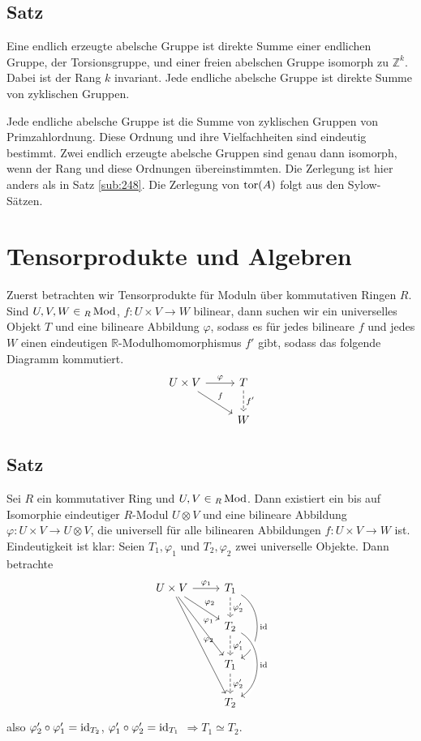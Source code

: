 \subsection[Satz: Umformulierung des Struktursatzes für endl. erzeugte abelsche Gruppen]{Satz} %
\label{sub:253}
Eine endlich erzeugte abelsche Gruppe ist direkte Summe einer endlichen Gruppe, der Torsionsgruppe, und einer freien abelschen Gruppe isomorph zu $\mathds{Z}^k$. Dabei ist 
der Rang $k$ invariant. Jede endliche abelsche Gruppe ist direkte Summe von zyklischen Gruppen.

Jede endliche abelsche Gruppe ist die Summe von zyklischen Gruppen von Primzahlordnung. Diese Ordnung und ihre Vielfachheiten sind eindeutig bestimmt. Zwei endlich erzeugte
abelsche Gruppen sind genau dann isomorph, wenn der Rang und diese Ordnungen übereinstimmten.
Die Zerlegung ist hier anders als in Satz \ref{sub:248}. Die Zerlegung von $\operatorname{tor}(A)$ folgt aus den Sylow-Sätzen.
\newpage

\section{Tensorprodukte und Algebren} %
\label{sec:3}
Zuerst betrachten wir Tensorprodukte für Moduln über kommutativen Ringen $R$. Sind $U,V, W \in {_R \operatorname{Mod}}$, $f : U \times V \to W$ bilinear, dann suchen wir ein 
universelles Objekt $T$ und eine bilineare Abbildung $\varphi$, sodass es für jedes bilineare $f$ und jedes $W$ einen eindeutigen $\mathds{R}$-Modulhomomorphismus $f'$ 
gibt, sodass das folgende Diagramm kommutiert.
\[
	\begin{tikzcd}
		U \times V \rar{\varphi} \drar{f} & T \dar[dashed]{f'}\\
		& W
	\end{tikzcd}
\]
\subsection[Satz: Universelle Eigenschaft des Tensorproduktes]{Satz} %
\label{sub:31}
Sei $R$ ein kommutativer Ring und $U,V \in {_R \operatorname{Mod}}$. Dann existiert ein bis auf Isomorphie eindeutiger $R$-Modul $U \otimes V$ und eine bilineare Abbildung 
$\varphi : U \times V \to U \otimes V$, die universell für alle bilinearen Abbildungen $f : U \times V \to W$ ist.
Eindeutigkeit ist klar: Seien $T_1, \varphi_1$ und $T_2, \varphi_2$ zwei universelle Objekte. Dann betrachte
\[
	\begin{tikzcd}
		U \times V \rar{\varphi_1} \drar{\varphi_2} \arrow{ddr}{\varphi_1} \arrow{dddr}{\varphi_2}& T_1  \dar[dashed]{\varphi_2'} \arrow[bend left = 60]{dd}{\id}	\\
		& T_2 \dar[dashed]{\varphi_1'}  \arrow[bend left = 60, crossing over]{dd}{\id}\\
		& T_1 \dar[dashed]{\varphi_2'} \\
		& T_2
	\end{tikzcd}
\]
also $\varphi_2' \circ \varphi_1' = \operatorname{id}_{T_2}$, $\varphi_1' \circ \varphi_2' = \operatorname{id}_{T_1}$ $\Rightarrow T_1 \simeq T_2$.

